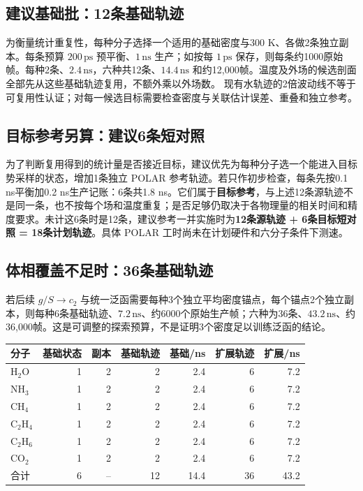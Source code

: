 \documentclass[11pt,a4paper]{article}
\begin{document}
\subsection{建议基础批：12条基础轨迹}
为衡量统计重复性，每种分子选择一个适用的基础密度与300 K、各做2条独立副本。每条预算 $200\,\mathrm{ps}$ 预平衡、$1\,\mathrm{ns}$ 生产；如按每 $1\,\mathrm{ps}$ 保存，则每条约1000原始帧。每种2条、$2.4\,\mathrm{ns}$，六种共12条、$14.4\,\mathrm{ns}$ 和约12,000帧。温度及外场的候选剖面全部先从这些基础轨迹复用，不额外乘以外场数。 现有水轨迹的2倍波动线不等于可复用性认证；对每一候选目标需要检查密度与关联估计误差、重叠和独立参考。

\subsection{目标参考另算：建议6条短对照}
为了判断复用得到的统计量是否接近目标，建议优先为每种分子选一个能进入目标势采样的状态，增加1条独立 POLAR 参考轨迹。若只作初步检查，每条先按0.1 ns平衡加0.2 ns生产记账：6条共1.8 ns。它们属于\textbf{目标参考}，与上述12条源轨迹不是同一条，也不按每个场和温度重复；是否足够仍取决于各物理量的相关时间和精度要求。未计这6条时是12条，建议参考一并实施时为\textbf{12条源轨迹 + 6条目标短对照 = 18条计划轨迹}。具体 POLAR 工时尚未在计划硬件和六分子条件下测速。

\subsection{体相覆盖不足时：36条基础轨迹}
若后续 $g/S\to c_2$ 与统一泛函需要每种3个独立平均密度锚点，每个锚点2个独立副本，则每种6条基础轨迹、$7.2\,\mathrm{ns}$、约6000个原始生产帧；六种为36条、$43.2\,\mathrm{ns}$、约36,000帧。这是可调整的探索预算，不是证明3个密度足以训练泛函的结论。

\begin{center}\small\begin{tabular}{lrrrrrr}\toprule
分子 & 基础状态 & 副本 & 基础轨迹 & 基础/ns & 扩展轨迹 & 扩展/ns \\\midrule
H$_2$O &1&2&2&2.4&6&7.2\\
NH$_3$ &1&2&2&2.4&6&7.2\\
CH$_4$ &1&2&2&2.4&6&7.2\\
C$_2$H$_4$ &1&2&2&2.4&6&7.2\\
C$_2$H$_6$ &1&2&2&2.4&6&7.2\\
CO$_2$ &1&2&2&2.4&6&7.2\\\midrule
合计 &6&--&12&14.4&36&43.2\\\bottomrule\end{tabular}\end{center}
\end{document}
